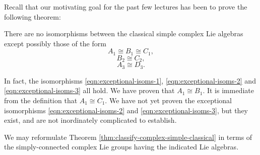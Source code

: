 \documentclass[reqno]{amsart} 
\begin{document}
Recall that our motivating goal for the past few lectures has been to prove the following theorem:
\begin{theorem}\label{thm:classify-complex-simple-classical}
  There are no isomorphisms between the classical simple complex Lie algebras except possibly those of the form
  \begin{equation}\label{eqn:exceptional-isoms-1}
    A_1 \cong B_1 \cong C_1,
  \end{equation}
  \begin{equation}\label{eqn:exceptional-isoms-2}
    B_2 \cong C_2,
  \end{equation}
  \begin{equation}\label{eqn:exceptional-isoms-3}
    A_3 \cong D_3.
  \end{equation}
\end{theorem}
\begin{remark}
  In fact, the isomorphisms \eqref{eqn:exceptional-isoms-1}, \eqref{eqn:exceptional-isoms-2} and \eqref{eqn:exceptional-isoms-3} all hold.  We have proven that $A_1 \cong B_1$.  It is immediate from the definition that $A_1 \cong C_1$.  We have not yet proven the exceptional isomorphisms \eqref{eqn:exceptional-isoms-2} and \eqref{eqn:exceptional-isoms-3}, but they exist, and are not inordinately complicated to establish.
\end{remark}
\begin{remark}
  We may reformulate Theorem \ref{thm:classify-complex-simple-classical} in terms of the simply-connected complex Lie groups having the indicated Lie algebras.
\end{remark}
\end{document}
